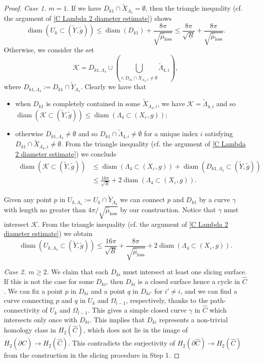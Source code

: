 \documentclass[11pt,letterpaper]{amsart}
\numberwithin{equation}{section}
\theoremstyle{definition}
\DeclareMathOperator{\diam}{diam}
\newcommand{\ve}{\varepsilon}
\begin{document}
\begin{proof}
{\it Case 1. $m=1$.} If we have $D_{k1}\cap \tilde X_{\Lambda_4}=\emptyset$, then the triangle inequality (cf. the argument of \eqref{C Lambda 2 diameter estimate}) shows
$$
\diam(U_{k}\subset (\tilde Y,\tilde g))\leq \diam(D_{k1})+\frac{8\pi}{\sqrt{\hat \mu_{\mathrm{loss}}}}\leq \frac{8\pi}{\sqrt{\underline R}}+\frac{8\pi}{\sqrt{\hat \mu_{\mathrm{loss}}}}.
$$
Otherwise, we consider the set
$$
\mathcal K=D_{k1,\Lambda_4}\cup\left(\bigcup_{i:D_{k1}\cap \tilde X_{\Lambda_4,i}\neq \emptyset}\tilde \Lambda_{4,i}\right),
$$
where $D_{k1,\Lambda_4}:=D_{k1}\cap \tilde Y_{\Lambda_4}$.
Clearly we have that
\begin{itemize}\setlength{\itemsep}{1mm}
\item when $D_{k1}$ is completely contained in some $\tilde X_{\Lambda_4,i}$, we have $\mathcal K=\tilde \Lambda_{4,i}$ and so $\diam(\mathcal K\subset (\tilde Y,\tilde g))\leq \diam(\Lambda_4\subset(X_\ve,g))$;
\item otherwise $D_{k1,\Lambda_4}\neq \emptyset$ and so $D_{k1}\cap \tilde \Lambda_{4,i}\neq \emptyset$ for {a unique} index $i$ satisfying $D_{k1}\cap \tilde X_{\Lambda_4,i}\neq \emptyset$. From the triangle inequality  (cf. the argument of \eqref{C Lambda 2 diameter estimate}) we conclude
\[
\begin{split}
\diam(\mathcal K\subset(\tilde Y,\tilde g)) & \leq \diam(\Lambda_4\subset(X_\ve,g))+\diam(D_{k1,\Lambda_4}\subset (\tilde Y,\tilde g))\\
& \leq \frac{16\pi}{\sqrt{\underline R}}+{2}\diam(\Lambda_4\subset(X_\ve,g)).
\end{split}
\]
\end{itemize}
Given any point $p$ in $U_{k,\Lambda_4}:=U_{k}\cap\tilde{Y}_{\Lambda_{4}}$ we can connect $p$ and $D_{k1}$ by a curve $\gamma$ with length no greater than $4\pi/\sqrt{\hat \mu_{\mathrm{loss}}}$ by our construction. Notice that $\gamma$ must intersect $\mathcal K$.
From the triangle inequality (cf. the argument of \eqref{C Lambda 2 diameter estimate}) we obtain
$$
\diam(U_{k,\Lambda_4}\subset (\tilde Y,\tilde g))\leq \frac{16\pi}{\sqrt{\underline R}}
+\frac{8\pi}{\sqrt{\hat \mu_{\mathrm{loss}}}}+{2}\diam(\Lambda_4\subset(X_\ve,g)).
$$

\medskip
{\it Case 2. $m\geq 2$.} We claim that each $D_{ki}$ must intersect at least one slicing surface. {If this is not the case for some $D_{ki}$, then $D_{ki}$ is a closed surface hence a cycle in $\hat C$. We can fix a point $p$ in $D_{ki}$ and a point $q$ in $D_{ki'}$ for $i '\neq i$, and we can find a curve connecting $p$ and $q$ in $U_k$ and $\Omega_{l-1}$, respectively, thanks to the path-connectivity of $U_k$ and $\Omega_{l-1}$. This gives} a simple closed curve $\gamma$ in $\hat C$ which intersects only once with $D_{ki}$. This implies that $D_{ki}$ represents a non-trivial homology class in $H_2(\hat C)$, which does not lie in the image of $H_2(\partial \hat C)\to H_2(\hat C)$. This contradicts the surjectivity of $H_2(\partial \hat C)\to H_2(\hat C)$ from the construction in the slicing procedure in Step 1.


\end{proof}
\end{document}
